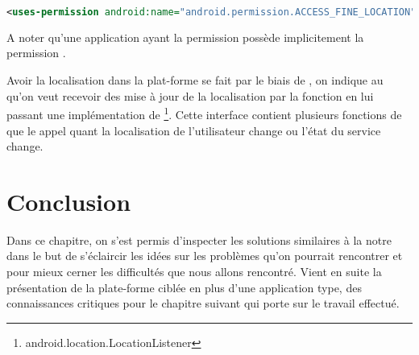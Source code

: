 \begin{lstlisting}[language=xml, caption=Permission pour la localisation par GPS.]
<uses-permission android:name="android.permission.ACCESS_FINE_LOCATION"/>
\end{lstlisting}

A noter qu'une application ayant la permission  possède implicitement la permission .

Avoir la localisation dans la plat-forme \android{} se fait par le biais de
, on indique au  qu'on veut recevoir des mise
à jour de la localisation par la fonction  en lui
passant une implémentation de
\footnote{android.location.LocationListener}. Cette
interface contient plusieurs fonctions de  que le
 appel quant la localisation de l'utilisateur change ou
l'état du service change\cite{guide:location_strategies}.


\section{Conclusion}

Dans ce chapitre, on s'est permis d'inspecter les solutions similaires à
la notre dans le but de s'éclaircir les idées sur les problèmes qu'on
pourrait rencontrer et pour mieux cerner les difficultés que nous allons
rencontré. Vient en suite la présentation de la plate-forme ciblée en
plus d'une application type, des connaissances critiques pour le chapitre
suivant qui porte sur le travail effectué.
